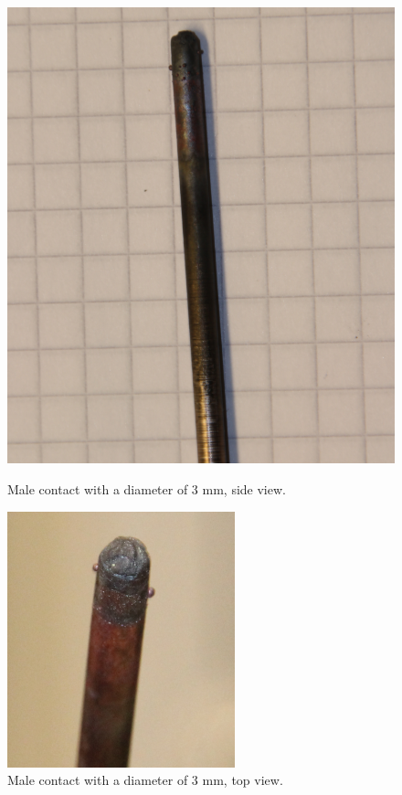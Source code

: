 \documentclass[10pt,a4paper]{article} %
\begin{document}
\begin{figure}[H]
\centering
\begin{minipage}{.5\textwidth}
  \centering
  \includegraphics[scale=0.2]{Bilder/Discussion/d3_630_burn.png}
  \caption{Male contact with a diameter of 3 mm, \newline side view.}
  \label{fig:d3_burn_side}
\end{minipage}%
\begin{minipage}{.5\textwidth}
  \centering
  \includegraphics[scale=0.53]{Bilder/Discussion/d3_630_top_burn.png}
  \caption{Male contact with a diameter of 3 mm, \newline top view.}
  \label{fig:d3_burn_top}
\end{minipage}
\end{figure}
\end{document}
